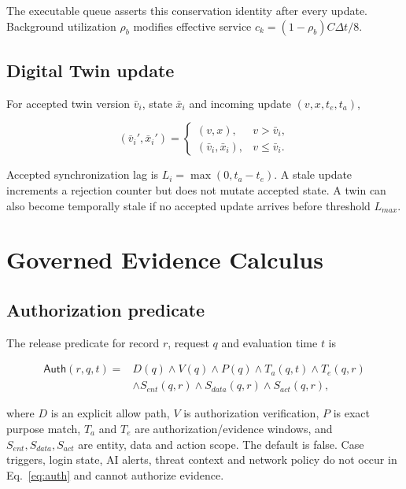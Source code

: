 ﻿\documentclass[10pt,a4paper,twocolumn]{article}
\begin{document}
The executable queue asserts this conservation identity after every update. Background utilization \(\rho_b\) modifies effective service \(c_k=(1-\rho_b)C\Delta t/8\).

\subsection{Digital Twin update}

For accepted twin version \(\bar v_i\), state \(\bar x_i\) and incoming update \((v,x,t_e,t_a)\),

\begin{equation}
(\bar v_i',\bar x_i')=
\begin{cases}
(v,x),&v>\bar v_i,\\
(\bar v_i,\bar x_i),&v\le\bar v_i.
\end{cases}
\end{equation}

Accepted synchronization lag is \(L_i=\max(0,t_a-t_e)\). A stale update increments a rejection counter but does not mutate accepted state. A twin can also become temporally stale if no accepted update arrives before threshold \(L_{max}\).

\section{Governed Evidence Calculus}

\subsection{Authorization predicate}

The release predicate for record \(r\), request \(q\) and evaluation time \(t\) is

\begin{align}
\mathsf{Auth}(r,q,t)={}&D(q)\land V(q)\land P(q)\land T_a(q,t)\land T_e(q,r)\nonumber\\
&\land S_{ent}(q,r)\land S_{data}(q,r)\land S_{act}(q,r),
\label{eq:auth}
\end{align}

where \(D\) is an explicit allow path, \(V\) is authorization verification, \(P\) is exact purpose match, \(T_a\) and \(T_e\) are authorization/evidence windows, and \(S_{ent},S_{data},S_{act}\) are entity, data and action scope. The default is false. Case triggers, login state, AI alerts, threat context and network policy do not occur in Eq.~\eqref{eq:auth} and cannot authorize evidence.
\end{document}
